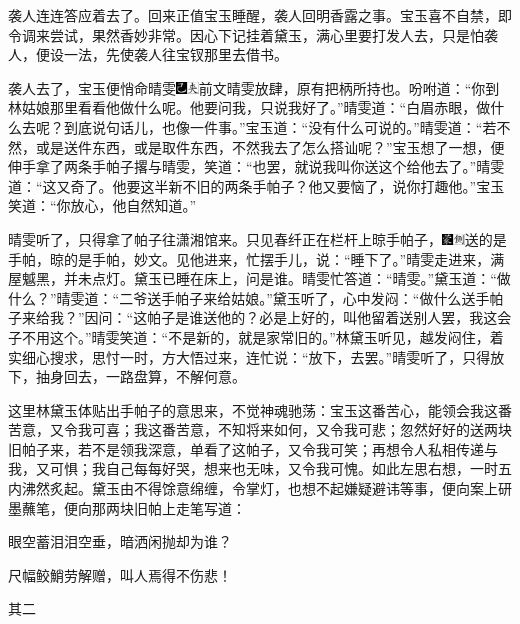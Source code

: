 袭人连连答应着去了。回来正值宝玉睡醒，袭人回明香露之事。宝玉喜不自禁，即令调来尝试，果然香妙非常。因心下记挂着黛玉，满心里要打发人去，只是怕袭人，便设一法，先使袭人往宝钗那里去借书。

袭人去了，宝玉便悄命晴雯{\includegraphics[width=3mm]{../Images/00003}\includegraphics[width=3mm]{../Images/00012}\footnotesize \kaishu 前文晴雯放肆，原有把柄所持也。}吩咐道：“你到林姑娘那里看看他做什么呢。他要问我，只说我好了。”晴雯道：“白眉赤眼，做什么去呢？到底说句话儿，也像一件事。”宝玉道：“没有什么可说的。”晴雯道：“若不然，或是送件东西，或是取件东西，不然我去了怎么搭讪呢？”宝玉想了一想，便伸手拿了两条手帕子撂与晴雯，笑道：“也罢，就说我叫你送这个给他去了。”晴雯道：“这又奇了。他要这半新不旧的两条手帕子？他又要恼了，说你打趣他。”宝玉笑道：“你放心，他自然知道。”

晴雯听了，只得拿了帕子往潇湘馆来。只见春纤正在栏杆上晾手帕子，{\includegraphics[width=3mm]{../Images/00006}\includegraphics[width=3mm]{../Images/00011}\footnotesize \kaishu 送的是手帕，晾的是手帕，妙文。}见他进来，忙摆手儿，说：“睡下了。”晴雯走进来，满屋魆黑，并未点灯。黛玉已睡在床上，问是谁。晴雯忙答道：“晴雯。”黛玉道：“做什么？”晴雯道：“二爷送手帕子来给姑娘。”黛玉听了，心中发闷：“做什么送手帕子来给我？”因问：“这帕子是谁送他的？必是上好的，叫他留着送别人罢，我这会子不用这个。”晴雯笑道：“不是新的，就是家常旧的。”林黛玉听见，越发闷住，着实细心搜求，思忖一时，方大悟过来，连忙说：“放下，去罢。”晴雯听了，只得放下，抽身回去，一路盘算，不解何意。

这里林黛玉体贴出手帕子的意思来，不觉神魂驰荡：宝玉这番苦心，能领会我这番苦意，又令我可喜；我这番苦意，不知将来如何，又令我可悲；忽然好好的送两块旧帕子来，若不是领我深意，单看了这帕子，又令我可笑；再想令人私相传递与我，又可惧；我自己每每好哭，想来也无味，又令我可愧。如此左思右想，一时五内沸然炙起。黛玉由不得馀意绵缠，令掌灯，也想不起嫌疑避讳等事，便向案上研墨蘸笔，便向那两块旧帕上走笔写道：

眼空蓄泪泪空垂，暗洒闲抛却为谁？

尺幅鲛鮹劳解赠，叫人焉得不伤悲！

其二

